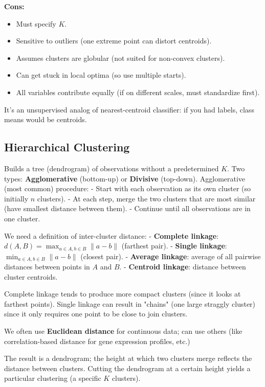 \documentclass[11pt]{article}
\begin{document}
\noindent \textbf{Cons:}
\begin{itemize}
    \item Must specify $K$.
    \item Sensitive to outliers (one extreme point can distort centroids).
    \item Assumes clusters are globular (not suited for non-convex clusters).
    \item Can get stuck in local optima (so use multiple starts).
    \item All variables contribute equally (if on different scales, must standardize first).
\end{itemize}

It’s an unsupervised analog of nearest-centroid classifier: if you had labels, class means would be centroids.

\subsection{Hierarchical Clustering}
Builds a tree (dendrogram) of observations without a predetermined $K$. Two types: \textbf{Agglomerative} (bottom-up) or \textbf{Divisive} (top-down).
Agglomerative (most common) procedure:
- Start with each observation as its own cluster (so initially $n$ clusters).
- At each step, merge the two clusters that are most similar (have smallest distance between them).
- Continue until all observations are in one cluster.

We need a definition of inter-cluster distance:
- \textbf{Complete linkage}: $d(A,B) = \max_{a \in A, b \in B} \|a-b\|$ (farthest pair).
- \textbf{Single linkage}: $\min_{a \in A, b \in B} \|a-b\|$ (closest pair).
- \textbf{Average linkage}: average of all pairwise distances between points in $A$ and $B$.
- \textbf{Centroid linkage}: distance between cluster centroids.

Complete linkage tends to produce more compact clusters (since it looks at farthest points). Single linkage can result in "chains" (one large straggly cluster) since it only requires one point to be close to join clusters.

We often use \textbf{Euclidean distance} for continuous data; can use others (like correlation-based distance for gene expression profiles, etc.)

The result is a dendrogram; the height at which two clusters merge reflects the distance between clusters. Cutting the dendrogram at a certain height yields a particular clustering (a specific $K$ clusters).
\end{document}
